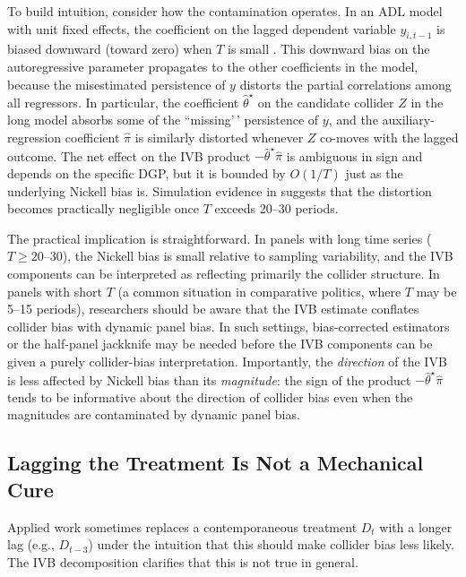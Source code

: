 \documentclass[
]{article}
\begin{document}
To build intuition, consider how the contamination operates. In an ADL
model with unit fixed effects, the coefficient on the lagged dependent
variable \(y_{i,t-1}\) is biased downward (toward zero) when \(T\) is
small \citep{nickell1981biases}. This downward bias on the
autoregressive parameter propagates to the other coefficients in the
model, because the misestimated persistence of \(y\) distorts the
partial correlations among all regressors. In particular, the
coefficient \(\hat{\theta}^{\star}\) on the candidate collider \(Z\) in
the long model absorbs some of the ``missing'\,' persistence of \(y\),
and the auxiliary-regression coefficient \(\hat{\pi}\) is similarly
distorted whenever \(Z\) co-moves with the lagged outcome. The net
effect on the IVB product \(-\hat{\theta}^{\star} \hat{\pi}\) is
ambiguous in sign and depends on the specific DGP, but it is bounded by
\(O(1/T)\) just as the underlying Nickell bias is. Simulation evidence
in \citet{judson_owen1999} suggests that the distortion becomes
practically negligible once \(T\) exceeds 20--30 periods.

The practical implication is straightforward. In panels with long time
series (\(T \geq 20\)--\(30\)), the Nickell bias is small relative to
sampling variability, and the IVB components can be interpreted as
reflecting primarily the collider structure. In panels with short \(T\)
(a common situation in comparative politics, where \(T\) may be 5--15
periods), researchers should be aware that the IVB estimate conflates
collider bias with dynamic panel bias. In such settings, bias-corrected
estimators \citep{arellano_bond1991} or the half-panel jackknife may be
needed before the IVB components can be given a purely collider-bias
interpretation. Importantly, the \textit{direction} of the IVB is less
affected by Nickell bias than its \textit{magnitude}: the sign of the
product \(-\hat{\theta}^{\star} \hat{\pi}\) tends to be informative
about the direction of collider bias even when the magnitudes are
contaminated by dynamic panel bias.

\subsection{\texorpdfstring{Lagging the Treatment Is Not a Mechanical
Cure
\label{sec:lag_not_cure}}{Lagging the Treatment Is Not a Mechanical Cure }}\label{lagging-the-treatment-is-not-a-mechanical-cure}

Applied work sometimes replaces a contemporaneous treatment \(D_t\) with
a longer lag (e.g., \(D_{t-3}\)) under the intuition that this should
make collider bias less likely. The IVB decomposition clarifies that
this is not true in general.
\end{document}
